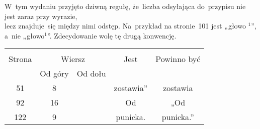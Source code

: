 \documentclass[a4paper,11pt]{article}
\begin{document}
\vspace{\spaceTwo}










\start W~tym wydaniu przyjęto dziwną regułę, że~liczba odsyłająca
do~przypisu nie jest zaraz przy wyrazie, \\
lecz znajduje~się między nimi odstęp. Na~przykład na stronie~101 jest
„głowo $^{ 1 }$”, a~nie „głowo$^{ 1 }$”. Zdecydowanie wolę tę
drugą konwencję.

\vspace{\spaceTwo}











\begin{center}

  \begin{tabular}{|c|c|c|c|c|}
    \hline
    & \multicolumn{2}{c|}{} & & \\
    Strona & \multicolumn{2}{c|}{Wiersz} & Jest
                              & Powinno być \\ \cline{2-3}
    & Od góry & Od dołu & & \\
    \hline
    51  &  8 & & zostawia” & zostawia \\
    92  & 16 & & Od & „Od \\
    122 &  9 & & punicka. & punicka.” \\
    \hline
  \end{tabular}

\end{center}

\vspace{\spaceTwo}
\end{document}
